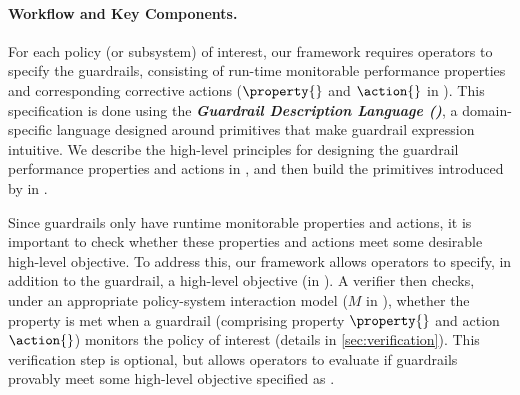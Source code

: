 \paragraph{Workflow and Key Components.}
For each policy (or subsystem) of interest, our framework requires operators to specify the guardrails, consisting of run-time monitorable performance properties and corresponding corrective actions ($\property{}$ and $\action{}$ in ).
This specification is done using the {\it \textbf{Guardrail Description Language (\lang)}}, a domain-specific language designed around primitives that make guardrail expression intuitive.
We describe the high-level principles for designing the guardrail performance properties and actions in , and then build the primitives introduced by \lang in .

Since guardrails only have runtime monitorable properties and actions, it is important to check whether these properties and actions meet some desirable high-level objective.
To address this, our framework allows operators to specify, in addition to the guardrail, a high-level objective (\perfsafety in ). 
A verifier then checks, under an appropriate policy-system interaction model ($M$ in ), whether the \perfsafety property is met when a guardrail (comprising property $\property{}$ and action $\action{}$) monitors the policy of interest (details in \cref{sec:verification}).
This verification step is optional, but allows operators to evaluate if guardrails provably meet some high-level objective specified as \perfsafety.

